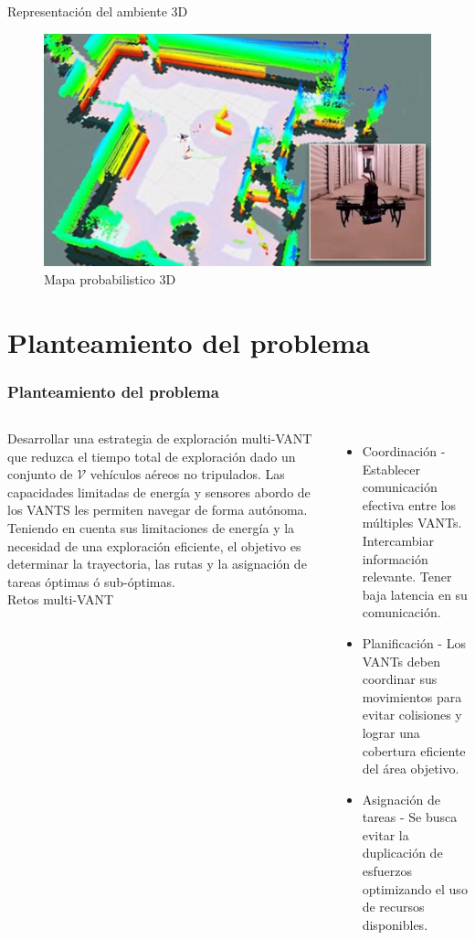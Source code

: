 \documentclass[
	12pt, %
	aspectratio=169, %
]{beamer}
\begin{document}
\begin{frame}{Representación del ambiente 3D}
  \begin{figure}
    \centering
    \includegraphics[scale=0.15]{drone_mapping}
    \caption[Caption for LOF]{Mapa probabilistico 3D\protect\footnotemark}
  \end{figure}
\end{frame}

\section{Planteamiento del problema}
\begin{frame}
  \frametitle{Planteamiento del problema}
  \begin{columns}
    \justifying
    \small Desarrollar una estrategia de exploración multi-VANT que reduzca el tiempo total de exploración dado un conjunto de $\mathcal{V}$ vehículos aéreos no tripulados. Las capacidades limitadas de energía y sensores abordo de los VANTS les permiten navegar de forma autónoma. Teniendo en cuenta sus limitaciones de energía y la necesidad de una exploración eficiente, el objetivo es determinar la trayectoria, las rutas y la asignación de tareas óptimas ó sub-óptimas.
    \\
    \pause
    \centering
    \small Retos multi-VANT
    \begin{itemize}
    \small \item Coordinación - Establecer comunicación efectiva entre los múltiples VANTs. Intercambiar información relevante. Tener baja latencia en su comunicación.
    \small \item Planificación - Los VANTs deben coordinar sus movimientos para evitar colisiones y lograr una cobertura eficiente del área objetivo.
    \small \item Asignación de tareas - Se busca evitar la duplicación de esfuerzos optimizando el uso de recursos disponibles.
    \end{itemize}
  \end{columns}
\end{frame}
\end{document}
